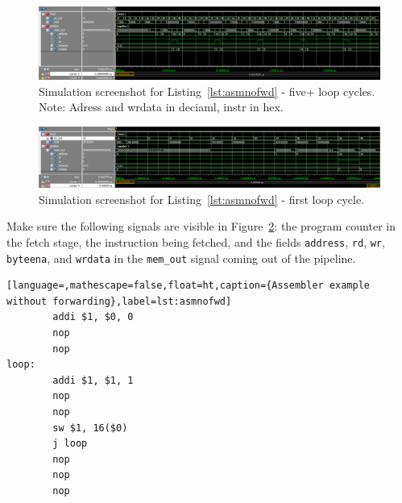 
\begin{figure}[ht!]
  \centering
  \includegraphics[width=1.0\linewidth]{sim1.png}
  \caption{Simulation screenshot for Listing~\ref{lst:asmnofwd} - five+  loop cycles. Note: Adress and wrdata in deciaml, instr in hex.}
  \label{fig:sim}
\end{figure}

\begin{figure}[ht!]
  \centering
  \includegraphics[width=1.0\linewidth]{sim3.png}
  \caption{Simulation screenshot for Listing~\ref{lst:asmnofwd} - first loop cycle.}
  \label{fig:sim}
\end{figure}

Make sure the following signals are visible in Figure~\ref{fig:sim}:
the program counter in the fetch stage, the instruction being fetched,
and the fields \texttt{address}, \texttt{rd}, \texttt{wr},
\texttt{byteena}, and \texttt{wrdata} in the \texttt{mem\_out} signal
coming out of the pipeline.

\begin{lstlisting}[language=,mathescape=false,float=ht,caption={Assembler example without forwarding},label=lst:asmnofwd]
        addi $1, $0, 0
        nop
        nop
loop:
        addi $1, $1, 1
        nop
        nop
        sw $1, 16($0)
        j loop
        nop
        nop
        nop
\end{lstlisting}



